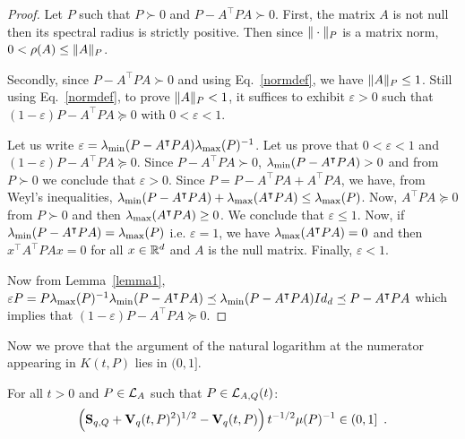 \documentclass[10pt]{article}
\begin{document}
\begin{proof}
Let $P$ such that $P\succ 0$ and $P-A^\intercal P A\succ 0$.  First, the matrix $A$ is not null then its spectral radius is strictly positive. Then since $\| \cdot\|_P$ is a matrix norm, $0<\rho(A) \leq \| A\|_P$.

Secondly, since $P-A^\intercal P A\succ 0$ and using Eq.~\eqref{normdef}, we have $\| A\|_P\leq 1$. Still using Eq.~\eqref{normdef}, to prove $\| A\|_P<1$, it suffices to exhibit $\varepsilon>0$ such that $(1-\varepsilon) P-A^\intercal P A\succeq 0$ with $0<\varepsilon<1$. 

Let us write $\varepsilon=\lambda_{\operatorname{min}}(P-A^\intercal P A) \lambda_{\operatorname{max}}(P)^{-1}$. Let us prove that $0<\varepsilon<1$ and $(1-\varepsilon) P-A^\intercal P A\succeq 0$.  Since $P-A^\intercal P A\succ 0$, $\lambda_{\operatorname{min}}(P-A^\intercal P A)>0$ and from $P\succ 0$ we conclude that $\varepsilon >0$. Since $P=P-A^ \intercal P A +A^\intercal P A$, we have, from Weyl's inequalities, $\lambda_{\operatorname{min}}(P-A^\intercal P A)+\lambda_{\operatorname{max}}(A^\intercal P A)\leq \lambda_{\operatorname{max}}(P)$. Now, $A^\intercal P A\succeq 0$ from $P\succ 0$ and then $\lambda_{\operatorname{max}}(A^\intercal P A)\geq 0$. We conclude that $\varepsilon\leq 1$. Now, if $\lambda_{\operatorname{min}}(P-A^\intercal P A)=\lambda_{\operatorname{max}}(P)$ i.e. $\varepsilon=1$, we have 
$\lambda_{\operatorname{max}}(A^\intercal P A)=0$ and then $x^\intercal A^\intercal P A x=0$ for all $x\in \mathbb R^d$ and $A$ is the null matrix. 
Finally, $\varepsilon<1$. 

Now from Lemma~\ref{lemma1}, $\varepsilon P=P\lambda_{\operatorname{max}}(P)^{-1}\lambda_{\operatorname{min}}(P-A^\intercal P A)\preceq \lambda_{\operatorname{min}}(P-A^\intercal P A)Id_d\preceq 
P-A^\intercal P A$ which implies that $(1-\varepsilon) P -A^\intercal P A\succeq 0$. 
\end{proof}

Now we prove that the argument of the natural logarithm at the numerator appearing in $K(t,P)$ lies in $(0,1]$. 

\begin{lemma}
For all $t>0$ and $P\in\mathcal{L}_{A}$ such that $P\in\mathcal{L}_{A,Q}(t)$: \[
\left(\mathbf{S}_{q,Q}+\mathbf{V}_{q}(t,P)^2)^{1/2}-\mathbf{V}_{q}(t,P)\right) t^{-1/2}\mu(P)^{-1}\in (0,1]\enspace .
\]
\end{lemma}
\end{document}

